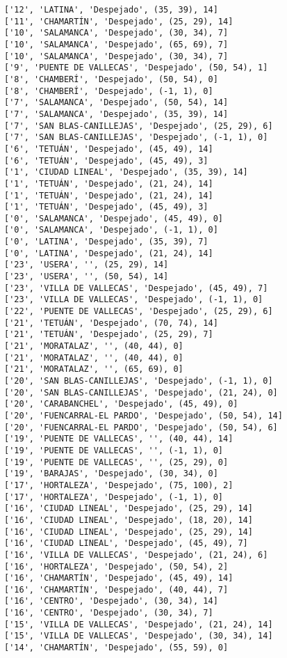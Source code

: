 \documentclass[11pt]{article}
\begin{document}
\begin{Verbatim}[commandchars=\\\{\}]
['12', 'LATINA', 'Despejado', (35, 39), 14]
['11', 'CHAMARTÍN', 'Despejado', (25, 29), 14]
['10', 'SALAMANCA', 'Despejado', (30, 34), 7]
['10', 'SALAMANCA', 'Despejado', (65, 69), 7]
['10', 'SALAMANCA', 'Despejado', (30, 34), 7]
['9', 'PUENTE DE VALLECAS', 'Despejado', (50, 54), 1]
['8', 'CHAMBERÍ', 'Despejado', (50, 54), 0]
['8', 'CHAMBERÍ', 'Despejado', (-1, 1), 0]
['7', 'SALAMANCA', 'Despejado', (50, 54), 14]
['7', 'SALAMANCA', 'Despejado', (35, 39), 14]
['7', 'SAN BLAS-CANILLEJAS', 'Despejado', (25, 29), 6]
['7', 'SAN BLAS-CANILLEJAS', 'Despejado', (-1, 1), 0]
['6', 'TETUÁN', 'Despejado', (45, 49), 14]
['6', 'TETUÁN', 'Despejado', (45, 49), 3]
['1', 'CIUDAD LINEAL', 'Despejado', (35, 39), 14]
['1', 'TETUÁN', 'Despejado', (21, 24), 14]
['1', 'TETUÁN', 'Despejado', (21, 24), 14]
['1', 'TETUÁN', 'Despejado', (45, 49), 3]
['0', 'SALAMANCA', 'Despejado', (45, 49), 0]
['0', 'SALAMANCA', 'Despejado', (-1, 1), 0]
['0', 'LATINA', 'Despejado', (35, 39), 7]
['0', 'LATINA', 'Despejado', (21, 24), 14]
['23', 'USERA', '', (25, 29), 14]
['23', 'USERA', '', (50, 54), 14]
['23', 'VILLA DE VALLECAS', 'Despejado', (45, 49), 7]
['23', 'VILLA DE VALLECAS', 'Despejado', (-1, 1), 0]
['22', 'PUENTE DE VALLECAS', 'Despejado', (25, 29), 6]
['21', 'TETUÁN', 'Despejado', (70, 74), 14]
['21', 'TETUÁN', 'Despejado', (25, 29), 7]
['21', 'MORATALAZ', '', (40, 44), 0]
['21', 'MORATALAZ', '', (40, 44), 0]
['21', 'MORATALAZ', '', (65, 69), 0]
['20', 'SAN BLAS-CANILLEJAS', 'Despejado', (-1, 1), 0]
['20', 'SAN BLAS-CANILLEJAS', 'Despejado', (21, 24), 0]
['20', 'CARABANCHEL', 'Despejado', (45, 49), 0]
['20', 'FUENCARRAL-EL PARDO', 'Despejado', (50, 54), 14]
['20', 'FUENCARRAL-EL PARDO', 'Despejado', (50, 54), 6]
['19', 'PUENTE DE VALLECAS', '', (40, 44), 14]
['19', 'PUENTE DE VALLECAS', '', (-1, 1), 0]
['19', 'PUENTE DE VALLECAS', '', (25, 29), 0]
['19', 'BARAJAS', 'Despejado', (30, 34), 0]
['17', 'HORTALEZA', 'Despejado', (75, 100), 2]
['17', 'HORTALEZA', 'Despejado', (-1, 1), 0]
['16', 'CIUDAD LINEAL', 'Despejado', (25, 29), 14]
['16', 'CIUDAD LINEAL', 'Despejado', (18, 20), 14]
['16', 'CIUDAD LINEAL', 'Despejado', (25, 29), 14]
['16', 'CIUDAD LINEAL', 'Despejado', (45, 49), 7]
['16', 'VILLA DE VALLECAS', 'Despejado', (21, 24), 6]
['16', 'HORTALEZA', 'Despejado', (50, 54), 2]
['16', 'CHAMARTÍN', 'Despejado', (45, 49), 14]
['16', 'CHAMARTÍN', 'Despejado', (40, 44), 7]
['16', 'CENTRO', 'Despejado', (30, 34), 14]
['16', 'CENTRO', 'Despejado', (30, 34), 7]
['15', 'VILLA DE VALLECAS', 'Despejado', (21, 24), 14]
['15', 'VILLA DE VALLECAS', 'Despejado', (30, 34), 14]
['14', 'CHAMARTÍN', 'Despejado', (55, 59), 0]

\end{Verbatim}
\end{document}
